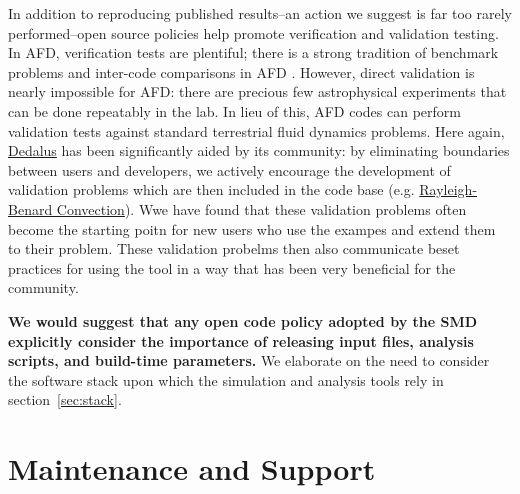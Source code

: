 \documentclass[12pt, titlepage]{aastex62}
\newcommand{\dedalus}{\href{http://dedalus-project.org}{Dedalus}}
\begin{document}
In addition to reproducing published results--an action we suggest is far too rarely performed--open source policies help promote verification and validation testing. In AFD, verification tests are plentiful; there is a strong tradition of benchmark problems and inter-code comparisons in AFD \citep[e.g.][among many others]{2001JGR...106.3715B,2014GeoJI.197..119M,2014ApJS..210...14K,2016MNRAS.455.4274L}. However, direct validation is nearly impossible for AFD: there are precious few astrophysical experiments that can be done repeatably in the lab. In lieu of this, AFD codes can perform validation tests against standard terrestrial fluid dynamics problems. Here again, \dedalus{} has been significantly aided by its community: by eliminating boundaries between users and developers, we actively encourage the development of validation problems which are then included in the code base (e.g. \href{https://bitbucket.org/dedalus-project/dedalus/src/cf57edf1516b931bc4ad0a7895d06219bbe90414/examples/ivp/3d_rayleigh_benard/rayleigh_benard.py?at=default&fileviewer=file-view-default}{Rayleigh-Benard Convection}). Wwe have found that these validation problems often become the starting poitn for new users who use the exampes and extend them to their problem. These validation probelms then also communicate beset practices for using the tool in a way that has been very beneficial for the community. 

\textbf{We would suggest that any open code policy adopted by the SMD explicitly consider the importance of releasing input files, analysis scripts, and build-time parameters.} We elaborate on the need to consider the software stack upon which the simulation and analysis tools rely in section~\ref{sec:stack}.


\section{Maintenance and Support}
\label{sec:support}

\end{document}
